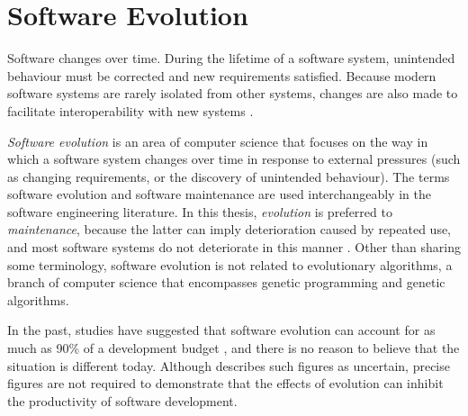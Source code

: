 \section{Software Evolution}
Software changes over time. During the lifetime of a software system, unintended behaviour must be corrected and new requirements satisfied. Because modern software systems are rarely isolated from other systems, changes are also made to facilitate interoperability with new systems \cite{sjoberg93quantifying}. 

% 

\emph{Software evolution} is an area of computer science that focuses on the way in which a software system changes over time in response to external pressures (such as changing requirements, or the discovery of unintended behaviour). The terms software evolution and software maintenance are used interchangeably in the software engineering literature. In this thesis, \emph{evolution} is preferred to \emph{maintenance}, because the latter can imply deterioration caused by repeated use, and most software systems do not deteriorate in this manner \cite{ramil00cost}. Other than sharing some terminology, software evolution is not related to evolutionary algorithms, a branch of computer science that encompasses genetic programming and genetic algorithms. 

In the past, studies have suggested that software evolution can account for as much as 90\% of a development budget \cite{erlikh00leveraging,moad90maintaining}, and there is no reason to believe that the situation is different today. Although \cite[ch. 21]{sommerville06software} describes such figures as uncertain, precise figures are not required to demonstrate that the effects of evolution can inhibit the productivity of software development.


